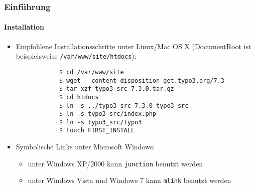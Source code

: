\begin{frame}[fragile]
	\frametitle{Einführung}
	\framesubtitle{Installation}

	\begin{itemize}
		\item Empfohlene Installationsschritte unter Linux/Mac OS X\newline
			(DocumentRoot ist beispielsweise \texttt{/var/www/site/htdocs}):
		\begin{lstlisting}
			$ cd /var/www/site
			$ wget --content-disposition get.typo3.org/7.3
			$ tar xzf typo3_src-7.3.0.tar.gz
			$ cd htdocs
			$ ln -s ../typo3_src-7.3.0 typo3_src
			$ ln -s typo3_src/index.php
			$ ln -s typo3_src/typo3
			$ touch FIRST_INSTALL
		\end{lstlisting}

		\item Symbolische Links unter Microsoft Windows:

			\begin{itemize}
				\item unter Windows XP/2000 kann \texttt{junction} benutzt werden
				\item unter Windows Vista und Windows 7 kann \texttt{mlink} benutzt werden
			\end{itemize}

	\end{itemize}
\end{frame}

